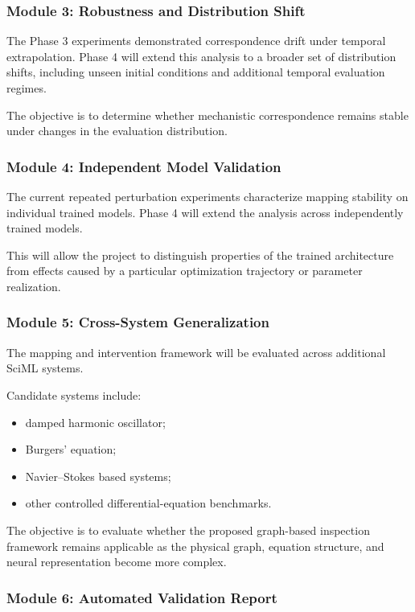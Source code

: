 \documentclass[12pt,singleside,a4paper]{article}
\begin{document}
\subsubsection{Module 3: Robustness and Distribution Shift}

The Phase 3 experiments demonstrated correspondence drift under
temporal extrapolation. Phase 4 will extend this analysis to a broader
set of distribution shifts, including unseen initial conditions and
additional temporal evaluation regimes.

The objective is to determine whether mechanistic correspondence
remains stable under changes in the evaluation distribution.


\subsubsection{Module 4: Independent Model Validation}

The current repeated perturbation experiments characterize mapping
stability on individual trained models. Phase 4 will extend the
analysis across independently trained models.

This will allow the project to distinguish properties of the trained
architecture from effects caused by a particular optimization
trajectory or parameter realization.


\subsubsection{Module 5: Cross-System Generalization}

The mapping and intervention framework will be evaluated across
additional SciML systems.

Candidate systems include:

\begin{itemize}
    \item damped harmonic oscillator;
    \item Burgers' equation;
    \item Navier--Stokes based systems;
    \item other controlled differential-equation benchmarks.
\end{itemize}

The objective is to evaluate whether the proposed graph-based
inspection framework remains applicable as the physical graph,
equation structure, and neural representation become more complex.


\subsubsection{Module 6: Automated Validation Report}
\end{document}
